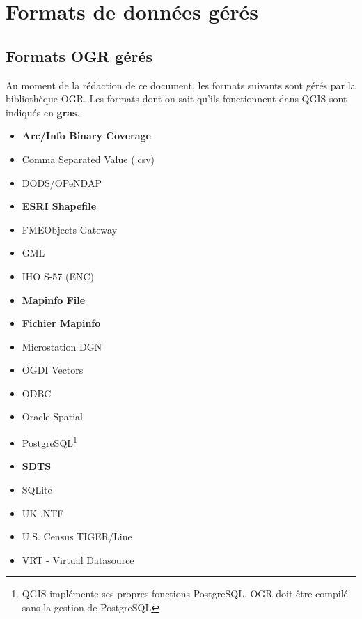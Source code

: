 \section{Formats de donn\'ees g\'er\'es}\label{appdx_data_formats}


\subsection{Formats OGR g\'er\'es}\label{appdx_ogr}

Au moment de la r\'edaction de ce document, les formats suivants sont g\'er\'es par la biblioth\`eque OGR. Les formats dont on sait qu'ils fonctionnent dans QGIS sont indiqu\'es en \textbf{gras}.

\begin{itemize}
\item \textbf{Arc/Info Binary Coverage}
\item Comma Separated Value (.csv) 
\item DODS/OPeNDAP
\item \textbf{ESRI Shapefile}
\item FMEObjects Gateway
\item GML
\item IHO S-57 (ENC)
\item \textbf{Mapinfo File}
\item \textbf{Fichier Mapinfo}
\item Microstation DGN
\item OGDI Vectors
\item ODBC
\item Oracle Spatial
\item PostgreSQL\footnote{QGIS impl\'emente ses propres fonctions PostgreSQL. OGR doit \^etre compil\'e sans la gestion de PostgreSQL}
\item \textbf{SDTS}
\item SQLite
\item UK .NTF
\item U.S. Census TIGER/Line
\item VRT - Virtual Datasource
\end{itemize}


